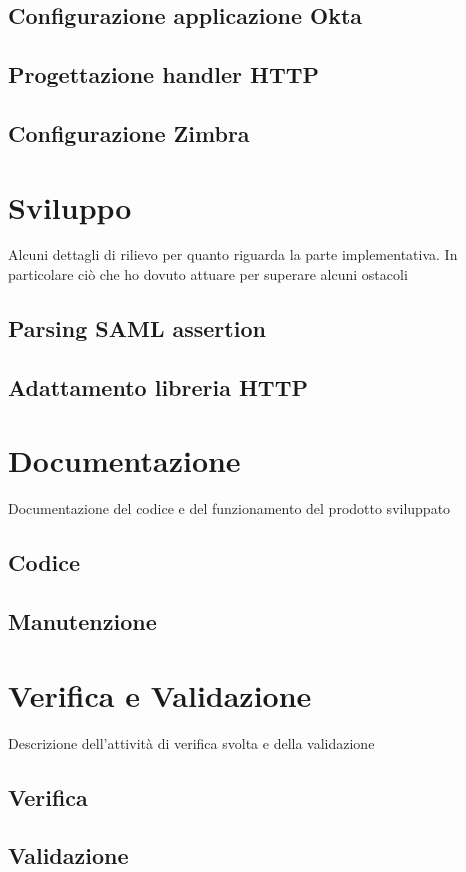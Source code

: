 \subsection{Configurazione applicazione Okta}
\subsection{Progettazione handler HTTP}
\subsection{Configurazione Zimbra}

\section{Sviluppo}
Alcuni dettagli di rilievo per quanto riguarda la parte implementativa. In particolare ciò che ho dovuto attuare per superare alcuni ostacoli
\subsection{Parsing SAML assertion}
\subsection{Adattamento libreria HTTP}

\section{Documentazione}
Documentazione del codice e del funzionamento del prodotto sviluppato
\subsection{Codice}
\subsection{Manutenzione}

\section{Verifica e Validazione}
Descrizione dell'attività di verifica svolta e della validazione
\subsection{Verifica}
\subsection{Validazione}